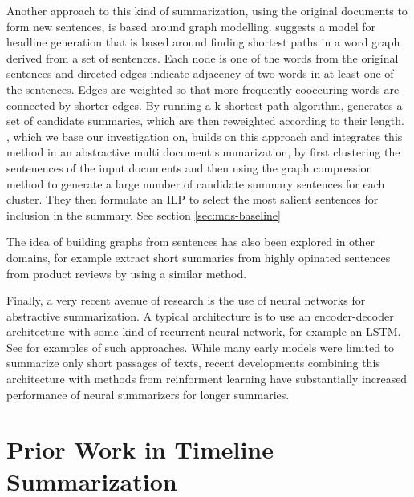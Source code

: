 \documentclass[a4paper,BCOR=10mm]{report}
\begin{document}
Another approach to this kind of summarization, using the original documents to form new sentences, is based around graph modelling. \citet{filippova} suggests a model for headline generation that is based around finding shortest paths in a word graph derived from a set of sentences.
Each node is one of the words from the original sentences and directed edges indicate adjacency of two words in at least one of the sentences. Edges are weighted so that more frequently cooccuring words are connected by shorter edges. By running a k-shortest path algorithm, \citeauthor{filippova} generates a set of candidate summaries, which are then reweighted according to their length.
\citet{banerjee}, which we base our investigation on, builds on this approach and integrates this method in an abstractive multi document summarization, by first clustering the sentenences of the input documents and then using the graph compression method to generate a large number of candidate summary sentences for each cluster. They then formulate an ILP to select the most salient sentences for inclusion in the summary. See section \ref{sec:mds-baseline} 

The idea of building graphs from sentences has also been explored in other domains, for example \citet{opinosis} extract short summaries from highly opinated sentences from product reviews by using a similar method.



Finally, a very recent avenue of research is the use of neural networks for abstractive summarization. A typical architecture is to use an encoder-decoder architecture with some kind of recurrent neural network, for example an LSTM. See \citet{nallapati, rush} for examples of such approaches.
While many early models were limited to summarize only short passages of texts, recent developments combining this architecture with methods from reinforment learning have substantially increased performance of neural summarizers for longer summaries. \citet{paulus}



\section{Prior Work in Timeline Summarization}

\end{document}
